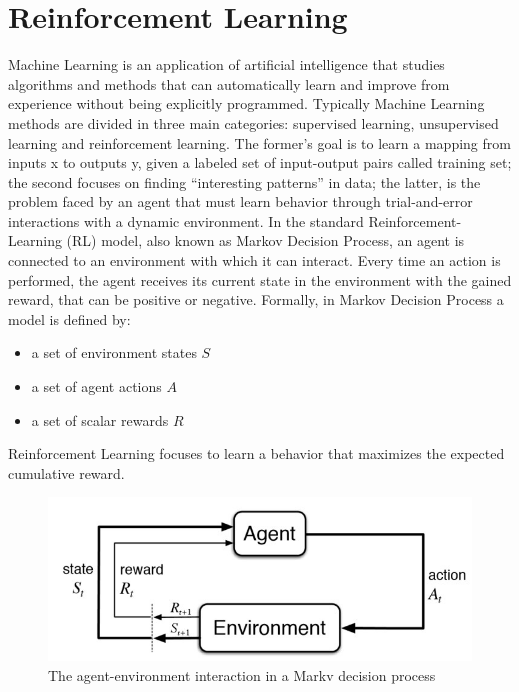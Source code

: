\documentclass[binding=0.6cm,Lau,oneside]{sapthesis} %
\begin{document}
\chapter{Reinforcement Learning}
Machine Learning is an application of artificial intelligence that studies algorithms and methods that can automatically learn and improve from experience without being explicitly programmed. \newline
Typically Machine Learning methods are divided in three main categories: supervised learning, unsupervised learning and reinforcement learning. \newline
The former’s goal is to learn a mapping from inputs x to outputs y, given a labeled set of input-output pairs called training set; the second focuses on finding “interesting patterns” in data; the latter, is the problem faced by an agent that must learn behavior through trial-and-error interactions with a dynamic environment. \newline
In the standard Reinforcement-Learning (RL) model, also known as Markov Decision Process, an agent is connected to an environment with which it can interact. Every time an action is performed, the agent receives its current state in the environment with the gained reward, that can be positive or negative. \newline
Formally, in Markov Decision Process a model is defined by:
\begin{itemize}
  \item a set of environment states $S$
  \item a set of agent actions $A$
  \item a set of scalar rewards $R$
\end{itemize}
Reinforcement Learning focuses to learn a behavior that maximizes the expected cumulative reward. \newline
\begin{figure}[H]
\caption{The agent-environment interaction in a Markv decision process}
\centering
\includegraphics[width=\textwidth]{markov}
\end{figure}
\end{document}
